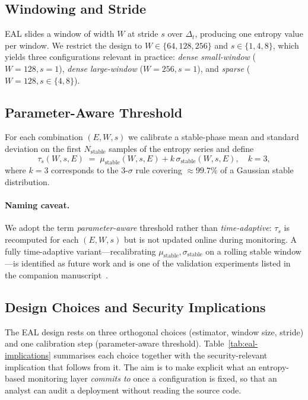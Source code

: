 \documentclass[runningheads]{llncs}
\newcommand{\taus}{\ensuremath{\tau_{s}}}
\begin{document}
\subsection{Windowing and Stride}

EAL slides a window of width $W$ at stride $s$ over $\Delta_t$,
producing one entropy value per window. We restrict the design to
$W \in \{64, 128, 256\}$ and $s \in \{1, 4, 8\}$, which yields three
configurations relevant in practice: \emph{dense small-window}
($W=128, s=1$), \emph{dense large-window} ($W=256, s=1$), and
\emph{sparse} ($W=128, s\in\{4,8\}$).

\subsection{Parameter-Aware Threshold}

For each combination $(E, W, s)$ we calibrate a stable-phase mean and
standard deviation on the first $N_{\mathrm{stable}}$ samples of the
entropy series and define
\begin{equation}
\taus(W, s, E) \;=\; \mu_{\mathrm{stable}}(W,s,E)
                     + k\,\sigma_{\mathrm{stable}}(W,s,E),
\quad k = 3,
\label{eq:taus}
\end{equation}
where $k=3$ corresponds to the 3-$\sigma$ rule covering
$\approx 99.7\%$ of a Gaussian stable distribution.

\paragraph{Naming caveat.} We adopt the term \emph{parameter-aware}
threshold rather than \emph{time-adaptive}: $\taus$ is recomputed for
each $(E, W, s)$ but is not updated online during monitoring. A
fully time-adaptive variant---recalibrating
$\mu_{\mathrm{stable}}, \sigma_{\mathrm{stable}}$ on a rolling stable
window---is identified as future work and is one of the validation
experiments listed in the companion manuscript~\cite{paper5}.

\subsection{Design Choices and Security Implications}
\label{sec:eal-implications}

The EAL design rests on three orthogonal choices (estimator, window
size, stride) and one calibration step (parameter-aware threshold).
Table~\ref{tab:eal-implications} summarises each choice together with
the security-relevant implication that follows from it. The aim is to
make explicit what an entropy-based monitoring layer \emph{commits to}
once a configuration is fixed, so that an analyst can audit a deployment
without reading the source code.
\end{document}

